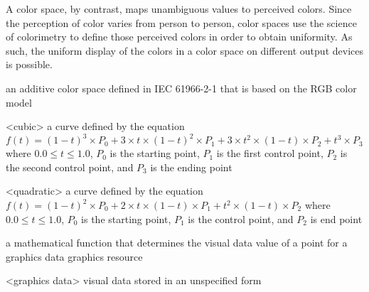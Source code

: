 A color space, by contrast, maps unambiguous values to perceived colors. Since the perception of color varies from person to person, color spaces use the science of colorimetry to define those perceived colors in order to obtain uniformity. As such, the uniform display of the colors in a color space on different output devices is possible.
\exitnote

an additive color space defined in IEC 61966-2-1 that is based on the RGB color model

%
%
<cubic> a curve defined by the 
equation $f(t) = (1 - t)^{3} \times P_{0} + 3 \times t \times (1 - t)^{2} 
\times P_{1} + 3 \times t^{2} \times (1 - t) \times P_{2} + t^{3} \times P_{3}$ 
where $0.0 \le t \le 1.0$, $P_{0}$ is the starting point, $P_{1}$ is the first 
control point, $P_{2}$ is the second control point, and $P_{3}$ is the 
ending point

<quadratic> a curve defined by the 
equation $f(t) = (1 - t)^{2} \times P_{0} + 2 \times t \times (1 - t) 
\times P_{1} + t^{2} \times (1 - t) \times P_{2}$ 
where $0.0 \le t \le 1.0$, $P_{0}$ is the starting point, $P_{1}$ is the 
control point, and $P_{2}$ is end point

a mathematical function that determines the visual data value of a point for a graphics data graphics resource

<graphics data> visual data stored in an unspecified form

